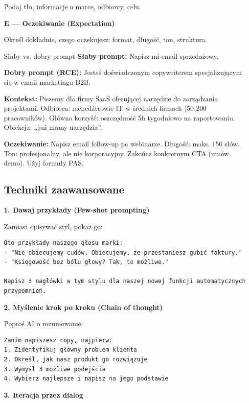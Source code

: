 \documentclass[
  12pt,
  a4paper,
  twoside,
  openright,
  12pt,
  DIV=12,
  BCOR=12mm]{scrbook}
\begin{document}
Podaj tło, informacje o marce, odbiorcy, celu.

\textbf{E --- Oczekiwanie (Expectation)}

Określ dokładnie, czego oczekujesz: format, długość, ton, struktura.

\begin{przyklad}{Słaby vs. dobry prompt}
\textbf{Słaby prompt:}
Napisz mi email sprzedażowy.

\textbf{Dobry prompt (RCE):}
Jesteś doświadczonym copywriterem specjalizującym się w email marketingu B2B.

\textbf{Kontekst:} Piszemy dla firmy SaaS oferującej narzędzie do zarządzania projektami. Odbiorca: menedżerowie IT w średnich firmach (50-200 pracowników). Główna korzyść: oszczędność 5h tygodniowo na raportowaniu. Obiekcja: „już mamy narzędzia”.

\textbf{Oczekiwanie:} Napisz email follow-up po webinarze. Długość: maks. 150 słów. Ton: profesjonalny, ale nie korporacyjny. Zakończ konkretnym CTA (umów demo). Użyj formuły PAS.
\end{przyklad}

\subsection{Techniki zaawansowane}\label{techniki-zaawansowane}

\textbf{1. Dawaj przykłady (Few-shot prompting)}

Zamiast opisywać styl, pokaż go:

\begin{verbatim}
Oto przykłady naszego głosu marki:
- "Nie obiecujemy cudów. Obiecujemy, że przestaniesz gubić faktury."
- "Księgowość bez bólu głowy? Tak, to możliwe."

Napisz 3 nagłówki w tym stylu dla naszej nowej funkcji automatycznych przypomnień.
\end{verbatim}

\textbf{2. Myślenie krok po kroku (Chain of thought)}

Poproś AI o rozumowanie:

\begin{verbatim}
Zanim napiszesz copy, najpierw:
1. Zidentyfikuj główny problem klienta
2. Określ, jak nasz produkt go rozwiązuje
3. Wymyśl 3 możliwe podejścia
4. Wybierz najlepsze i napisz na jego podstawie
\end{verbatim}

\textbf{3. Iteracja przez dialog}
\end{document}
